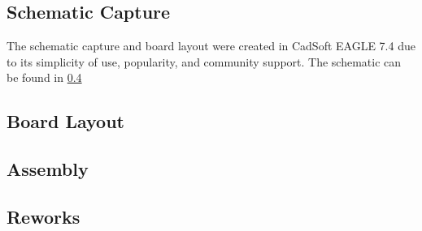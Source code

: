 \subsection{Schematic Capture}
The schematic capture and board layout were created in CadSoft EAGLE 7.4 due to its simplicity of use, popularity, and community support. The schematic can be found in \ref{}

\subsection{Board Layout}

\subsection{Assembly}

\subsection{Reworks}